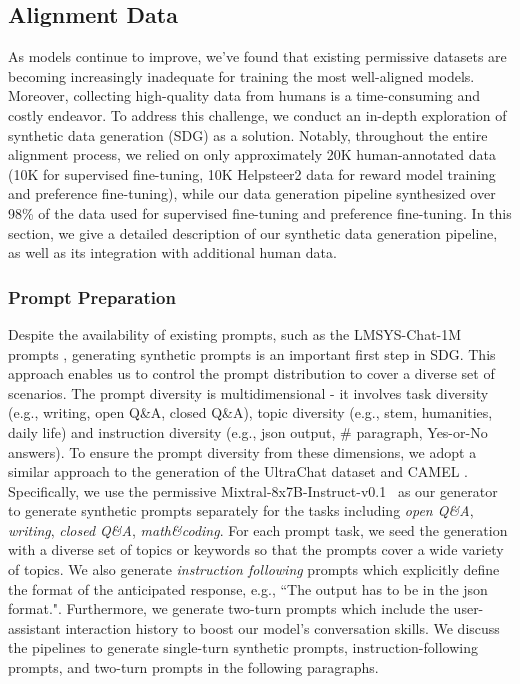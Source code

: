 \documentclass[11pt]{article}
\begin{document}
\subsection{Alignment Data}
\label{sec:alignment-data}
As models continue to improve, we've found that existing permissive datasets are becoming increasingly inadequate for training the most well-aligned models. Moreover, collecting high-quality data from humans is a time-consuming and costly endeavor. To address this challenge, we conduct an in-depth exploration of synthetic data generation (SDG) as a solution. Notably, throughout the entire alignment process, we relied on only approximately 20K human-annotated data (10K for supervised fine-tuning, 10K Helpsteer2 data for reward model training and preference fine-tuning), while our data generation pipeline synthesized over 98\% of the data used for supervised fine-tuning and preference fine-tuning. In this section, we give a detailed description of our synthetic data generation pipeline, as well as its integration with additional human data.

\subsubsection{Prompt Preparation}
Despite the availability of existing prompts, such as the LMSYS-Chat-1M prompts \citep{zheng2023lmsys}, generating synthetic prompts is an important first step in SDG. This approach enables us to control the prompt distribution to cover a diverse set of scenarios.
The prompt diversity is multidimensional - it involves task diversity (e.g., writing, open Q\&A, closed Q\&A), topic diversity (e.g., stem, humanities, daily life) and instruction diversity (e.g., json output, \# paragraph, Yes-or-No answers). To ensure the prompt diversity from these dimensions, we adopt a similar approach to the generation of the UltraChat dataset \citep{ding2023enhancing} and CAMEL \citep{li2023camel}. Specifically, we use the permissive Mixtral-8x7B-Instruct-v0.1~\citep{jiang2024mixtral} as our generator to generate synthetic prompts separately for the tasks including \textit{open Q\&A}, \textit{writing}, \textit{closed Q\&A}, \textit{math\&coding}. For each prompt task, we seed the generation with a diverse set of topics or keywords so that the prompts cover a wide variety of topics. We also generate \textit{instruction following} prompts which explicitly define the format of the anticipated response, e.g., ``The output has to be in the json format.". Furthermore, we generate two-turn prompts which include the user-assistant interaction history to boost our model's conversation skills. We discuss the pipelines to generate single-turn synthetic prompts, instruction-following prompts, and two-turn prompts in the following paragraphs.
\end{document}
